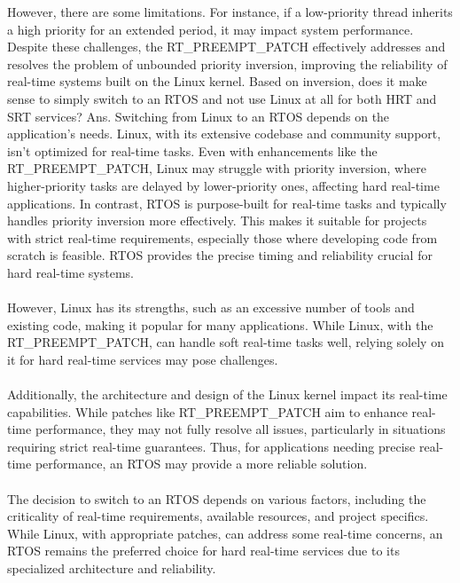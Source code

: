 \documentclass[a4paper,11pt]{article}%
\newenvironment{qanda}{\setlength{\parindent}{0pt}}{\bigskip}
\begin{document}
\begin{qanda}
\begin{enumerate}
\begin{enumerate}
					  However, there are some limitations. For instance, if a low-priority thread inherits a high priority for an extended period, it may impact system performance. Despite these challenges, the RT\_PREEMPT\_PATCH effectively addresses and resolves the problem of unbounded priority inversion, improving the reliability of real-time systems built on the Linux kernel.
					  Based on inversion, does it make sense to simply switch to an RTOS and not use Linux at all for both HRT and SRT services?
					  Ans. Switching from Linux to an RTOS depends on the application's needs. Linux, with its extensive codebase and community support, isn't optimized for real-time tasks. Even with enhancements like the RT\_PREEMPT\_PATCH, Linux may struggle with priority inversion, where higher-priority tasks are delayed by lower-priority ones, affecting hard real-time applications.
					  In contrast, RTOS is purpose-built for real-time tasks and typically handles priority inversion more effectively. This makes it suitable for projects with strict real-time requirements, especially those where developing code from scratch is feasible. RTOS provides the precise timing and reliability crucial for hard real-time systems.\\\\
					  However, Linux has its strengths, such as an excessive number of tools and existing code, making it popular for many applications. While Linux, with the RT\_PREEMPT\_PATCH, can handle soft real-time tasks well, relying solely on it for hard real-time services may pose challenges.\\\\
					  Additionally, the architecture and design of the Linux kernel impact its real-time capabilities. While patches like RT\_PREEMPT\_PATCH aim to enhance real-time performance, they may not fully resolve all issues, particularly in situations requiring strict real-time guarantees. Thus, for applications needing precise real-time performance, an RTOS may provide a more reliable solution.\\\\
					  The decision to switch to an RTOS depends on various factors, including the criticality of real-time requirements, available resources, and project specifics. While Linux, with appropriate patches, can address some real-time concerns, an RTOS remains the preferred choice for hard real-time services due to its specialized architecture and reliability.
			\end{enumerate}



\end{enumerate}
\end{qanda}
\end{document}
